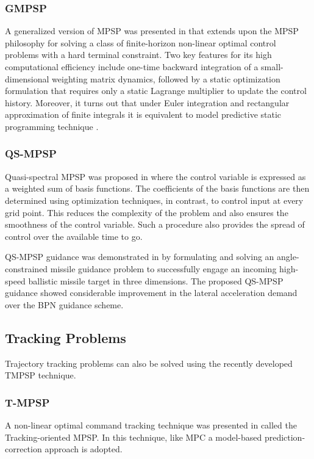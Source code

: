 \documentclass[12pt]{article}
\begin{document}
\subsubsection*{GMPSP}
A generalized version of MPSP was presented in \cite{maity2014generalized} that extends upon the MPSP philosophy for solving a class of finite-horizon non-linear optimal control problems with a hard terminal constraint. Two key features for its high computational efficiency include one-time backward integration of a small-dimensional weighting matrix dynamics, followed by a static optimization formulation that requires only a static Lagrange multiplier to update the control history. Moreover, it turns out that
under Euler integration and rectangular approximation of finite integrals it is equivalent to model predictive static programming technique \cite{padhi2009model}.

\subsubsection*{QS-MPSP}
Quasi-spectral MPSP was proposed in \cite{mondal2018angle} where the control variable is expressed as a weighted sum of basis functions. The coefficients of the basis functions are then determined using optimization techniques, in contrast, to control input at every grid point. This reduces the complexity of the problem and also ensures the smoothness of the control variable. Such a procedure also provides the spread of control over the available time to go.

QS-MPSP guidance was demonstrated in \cite{mondal2018angle} by formulating and solving an angle-constrained missile guidance problem to successfully engage an incoming high-speed ballistic missile target in three dimensions. The proposed QS-MPSP guidance showed considerable improvement in the lateral acceleration demand over the BPN guidance scheme.

\subsection{Tracking Problems}

Trajectory tracking problems can also be solved using the recently developed TMPSP technique.

\subsubsection*{T-MPSP}
A non-linear optimal command tracking technique was presented in \cite{kumar2019model} called the Tracking-oriented MPSP. In this technique, like MPC a model-based prediction-correction approach is adopted.
\end{document}
